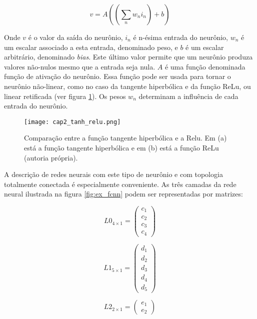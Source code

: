\begin{equation} \label{eq:non-conv-layer}
	v=A \left( \left( \sum_n w_n i_n \right) + b \right)
\end{equation}

Onde $v$ é o valor da saída do neurônio, $i_n$ é n-ésima entrada do neurônio,
$w_n$ é um escalar associado a esta entrada, denominado peso, e $b$ é um
escalar arbitrário, denominado \emph{bias}. Este último valor permite que um
neurônio produza valores não-nulos mesmo que a entrada seja nula. $A$ é uma
função denominada função de ativação do neurônio. Essa função pode ser usada
para tornar o neurônio não-linear, como no caso da tangente hiperbólica e da
função ReLu, ou linear retificada (ver figura \ref{fig:cap2_tanh_relu}). Os
pesos $w_n$ determinam a influência de cada entrada do neurônio.

\begin{figure}[!htb]
	\centering
	\texttt{[image: cap2\_tanh\_relu.png]}
	\caption[Comparação da tangente hiperbólica com a ReLu]{
		Comparação entre a função tangente hiperbólica e a Relu. Em (a) está a
		função tangente hiperbólica e em (b) está a função ReLu
		(autoria própria).}
	\label{fig:cap2_tanh_relu}
\end{figure}

A descrição de redes neurais com este tipo de neurônio e com topologia
totalmente conectada é especialmente conveniente. As três camadas
da rede neural ilustrada na figura \ref{fig:ex_fcnn} podem ser representadas
por matrizes:

\noindent\begin{minipage}{.333\linewidth}
	\begin{equation} \label{eq:l0}
		L0_{4 \times 1} =
			\begin{pmatrix}
				c_1 \\
				c_2 \\
				c_3 \\
				c_4
			\end{pmatrix}
	\end{equation}
\end{minipage}
\begin{minipage}{.333\linewidth}
	\begin{equation} \label{eq:l1}
		L1_{5 \times 1} =
			\begin{pmatrix}
				d_1 \\
				d_2 \\
				d_3 \\
				d_4 \\
				d_5
			\end{pmatrix}
	\end{equation}
\end{minipage}
\begin{minipage}{.333\linewidth}
	\begin{equation} \label{eq:l2}
		L2_{2 \times 1} =
			\begin{pmatrix}
				e_1 \\
				e_2
			\end{pmatrix}
	\end{equation}
\end{minipage}

